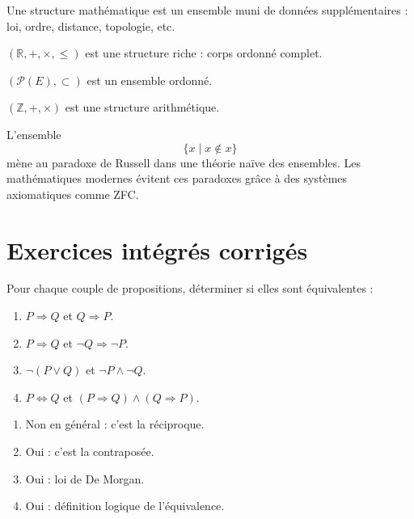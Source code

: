 \documentclass[11pt,a4paper]{article}
\newcommand{\Z}{\mathbb{Z}}
\newcommand{\R}{\mathbb{R}}
\newcommand{\non}{\neg}
\newcommand{\et}{\wedge}
\newcommand{\ou}{\vee}
\newcommand{\imp}{\Rightarrow}
\newcommand{\ssi}{\Longleftrightarrow}
\newcommand{\deuxetoiles}{\(\star\star\)}
\begin{document}
\begin{definitionbox}
Une structure mathématique est un ensemble muni de données supplémentaires : loi, ordre, distance, topologie, etc.
\end{definitionbox}

\begin{exemplebox}
\((\R,+,\times,\leq)\) est une structure riche : corps ordonné complet.

\((\mathcal P(E),\subset)\) est un ensemble ordonné.

\((\Z,+,\times)\) est une structure arithmétique.
\end{exemplebox}

\begin{ensbox}
L'ensemble
\[
\{x\mid x\notin x\}
\]
mène au paradoxe de Russell dans une théorie naïve des ensembles. Les mathématiques modernes évitent ces paradoxes grâce à des systèmes axiomatiques comme ZFC.
\end{ensbox}

\section{Exercices intégrés corrigés}

\begin{exercicebox}[8 -- Connecteurs -- \deuxetoiles]
Pour chaque couple de propositions, déterminer si elles sont équivalentes :
\begin{enumerate}
    \item \(P\imp Q\) et \(Q\imp P\).
    \item \(P\imp Q\) et \(\non Q\imp\non P\).
    \item \(\non(P\ou Q)\) et \(\non P\et\non Q\).
    \item \(P\ssi Q\) et \((P\imp Q)\et(Q\imp P)\).
\end{enumerate}
\end{exercicebox}

\begin{correctionbox}[8]
\begin{enumerate}
    \item Non en général : c'est la réciproque.
    \item Oui : c'est la contraposée.
    \item Oui : loi de De Morgan.
    \item Oui : définition logique de l'équivalence.
\end{enumerate}
\end{correctionbox}
\end{document}
